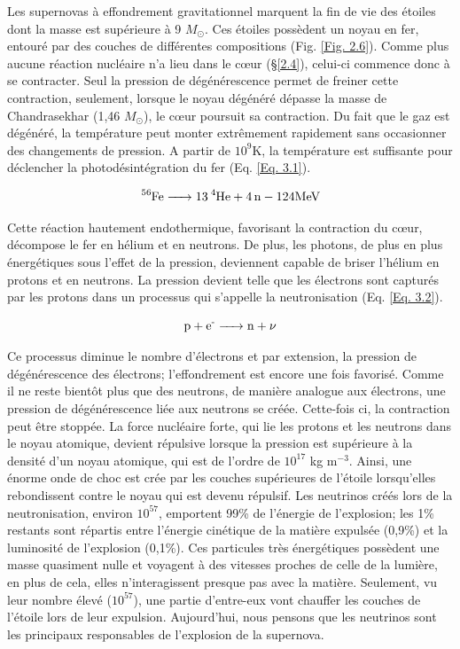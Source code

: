 Les supernovas à effondrement gravitationnel marquent la fin de vie des étoiles dont la masse est supérieure à 9 $M_\odot$. Ces étoiles possèdent un noyau en fer, entouré par des couches de différentes compositions (Fig. \ref{Fig. 2.6}). Comme plus aucune réaction nucléaire n'a lieu dans le cœur (§\ref{2.4}), celui-ci commence donc à se contracter. Seul la pression de dégénérescence permet de freiner cette contraction, seulement, lorsque le noyau dégénéré dépasse la masse de Chandrasekhar (1,46 $M_\odot$), le cœur poursuit sa contraction. Du fait que le gaz est dégénéré, la température peut monter extrêmement rapidement sans occasionner des changements de pression. A partir de $10^{9}$K, la température est suffisante pour déclencher la photodésintégration du fer (Eq.  \ref{Eq. 3.1}).  %

\begin{equation} \ce{\ce{^{56}Fe} -> \ce{13\ce{^{4}He}} + \ce{4n} - {124MeV}}\label{Eq. 3.1}\end{equation}\smallskip

Cette réaction hautement endothermique, favorisant la contraction du cœur, décompose le fer en hélium et en neutrons. De plus, les photons, de plus en plus énergétiques sous l'effet de la pression, deviennent capable de briser l'hélium en protons et en neutrons. La pression devient telle que les électrons sont capturés par les protons dans un processus qui s'appelle la neutronisation (Eq. \ref{Eq. 3.2}).

\begin{equation} \ce{p + e{^-} -> n + $\nu$\label{Eq. 3.2}}\end{equation}\smallskip

Ce processus diminue le nombre d'électrons et par extension, la pression de dégénérescence des électrons; l'effondrement est encore une fois favorisé. Comme il ne reste bientôt plus que des neutrons, de manière analogue aux électrons, une pression de dégénérescence liée aux neutrons se créée. Cette-fois ci, la contraction  peut être stoppée. La force nucléaire forte, qui lie les protons et les neutrons dans le noyau atomique, devient répulsive lorsque la pression est supérieure à la densité d'un noyau atomique, qui est de l'ordre de $10^{17}$ kg  m$^{-3}$. Ainsi, une énorme onde de choc est crée par les couches supérieures de l'étoile lorsqu'elles rebondissent contre le noyau qui est devenu répulsif.
Les neutrinos créés lors de la neutronisation, environ $10^{57}$, emportent 99\% de l'énergie de l'explosion; les 1\% restants sont répartis entre l'énergie cinétique de la matière expulsée (0,9\%) et la luminosité de l'explosion (0,1\%). Ces particules très énergétiques possèdent une masse quasiment nulle et voyagent à des vitesses proches de celle de la lumière, en plus de cela, elles n'interagissent presque pas avec la matière. Seulement, vu leur nombre élevé ($10^{57}$), une partie d'entre-eux vont chauffer les couches de l'étoile lors de leur expulsion. Aujourd'hui, nous pensons que les neutrinos sont les principaux responsables de l'explosion de la supernova.\smallskip

